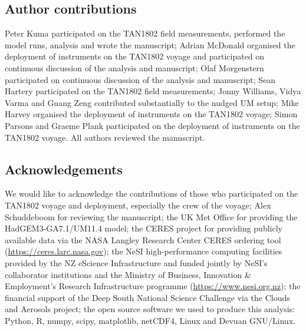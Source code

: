 

\small
\sffamily

\subsection*{Author contributions}

Peter Kuma participated on the TAN1802 field measurements, performed the model runs, analysis and wrote the manuscript;
Adrian McDonald organised the deployment of instruments on the TAN1802 voyage and participated on continuous discussion of the analysis
and manuscript;
Olaf Morgenstern participated on continuous discussion of the analysis and
manuscript;
Sean Hartery participated on the TAN1802 field measurements;
Jonny Williams, Vidya Varma and Guang Zeng contributed substantially to the
nudged UM setup;
Mike Harvey organised the deployment of instruments on the TAN1802 voyage;
Simon Parsons and Graeme Plank participated on the deployment of instruments on the TAN1802
voyage. All authors reviewed the manuscript.

\subsection*{Acknowledgements}

We would like to acknowledge the contributions of those who participated on
the TAN1802 voyage and deployment, especially the crew of the voyage;
Alex Schuddeboom for reviewing the manuscript; the UK Met
Office for providing the HadGEM3-GA7.1/UM11.4 model;
the CERES project for providing publicly available data via the NASA Langley
Research Center CERES ordering tool (\url{https://ceres.larc.nasa.gov});
the
NeSI high-performance computing facilities
provided by the NZ eScience Infrastructure and funded jointly by NeSI's
collaborator institutions and the Ministry of Business, Innovation \&
Employment's Research Infrastructure programme (\url{https://www.nesi.org.nz});
the financial support of the Deep South National Science Challenge via the Clouds and
Aerosols project; the open source software we used to produce this analysis: Python, R,
numpy, scipy, matplotlib,
netCDF4, Linux and Devuan GNU/Linux.

\normalfont
\normalsize

